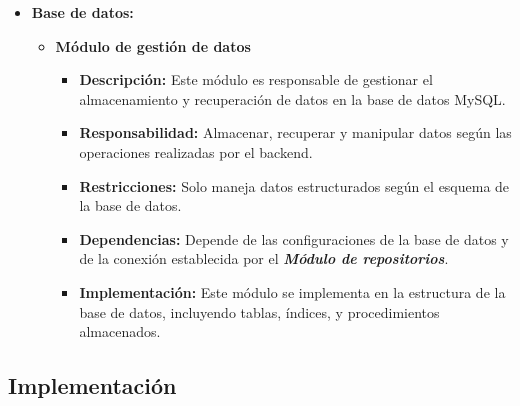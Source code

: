 \documentclass{article} %
\begin{document}
\begin{itemize}
        \item \textbf{Base de datos:}
        \begin{itemize}
            \item \textbf{Módulo de gestión de datos}
            \begin{itemize}
                \item \textbf{Descripción:} Este módulo es responsable de gestionar el almacenamiento y recuperación de datos en la base de datos MySQL.
                \item \textbf{Responsabilidad:} Almacenar, recuperar y manipular datos según las operaciones realizadas por el backend.
                \item \textbf{Restricciones:} Solo maneja datos estructurados según el esquema de la base de datos.
                \item \textbf{Dependencias:} Depende de las configuraciones de la base de datos y de la conexión establecida por el \textbf{\emph{Módulo de repositorios}}.
                \item \textbf{Implementación:} Este módulo se implementa en la estructura de la base de datos, incluyendo tablas, índices, y procedimientos almacenados.
            \end{itemize}
        \end{itemize}
    \end{itemize}
    
    \subsection{Implementación}
\end{document}
